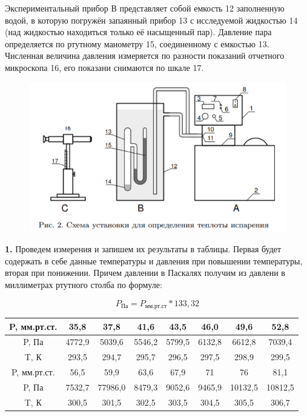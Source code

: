 \documentclass[12pt,a4paper]{article}
\begin{document}
Экспериментальный прибор В представляет собой емкость 12 заполненную водой, в которую погружён запаянный прибор 13 с исследуемой жидкостью 14 (над жидкостью находиться только её насыщенный пар). Давление пара определяется по ртутному манометру 15, соединенному с емкостью 13. Численная величина давления измеряется по разности показаний отчетного микроскопа 16, его показани снимаются по шкале 17.

\begin{figure}[h!]
\centering
\includegraphics[scale=0.8]{Screenshot_2.png}
\label{fig:Image1}
\end{figure}

\vspace{0.5cm}

\textbf{1.} Проведем измерения и запишем их результаты в таблицы. Первая будет содержать в себе данные температуры и давления при повышении температуры, вторая при понижении. Причем давлении в Паскалях получим из давлени в миллиметрах ртутного столба по формуле:

\[P_{\textit{Па}} = P_{\textit{мм.рт.ст}} * 133,32\]

\begin{tabular}{|c|c|c|c|c|c|c|c|}
\hline 
P, мм.рт.ст. & 35,8 & 37,8 & 41,6 & 43,5 & 46,0 & 49,6 & 52,8 \\ 
\hline 
P, Па & 4772,9 & 5039,6 & 5546,2 & 5799,5 & 6132,8 & 6612,8 & 7039,4 \\ 
\hline 
T, К & 293,5 & 294,7 & 295,7 & 296,5 & 297,5 & 298,9 & 299,5 \\ 
\hline
\hline 
P, мм.рт.ст. & 56,5 & 59,9 & 63,6 & 67,9 & 71 & 76 & 81,1 \\ 
\hline 
P, Па & 7532,7 & 77986,0 & 8479,3 & 9052,6 & 9465,9 & 10132,5 & 10812,5 \\ 
\hline 
T, К &  300,5 & 301,5 & 302,5 & 303,5 & 304,5 & 305,5 & 306,7 \\ 
\hline 
\end{tabular}
\end{document}
